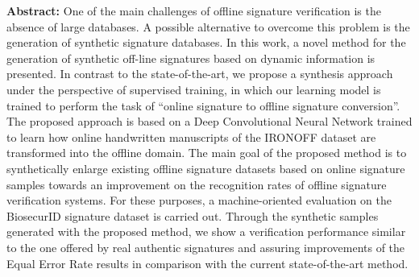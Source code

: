\begin{apendicesenv}
\textbf{Abstract:} One of the main challenges of offline signature verification is the absence of large databases. A possible alternative to overcome this problem is the generation of synthetic signature databases. In this work, a novel method for the generation of synthetic off-line signatures based on dynamic information is presented. In contrast to the state-of-the-art, we propose a synthesis approach under the perspective of supervised training, in which our learning model is trained to perform the task of “online signature to offline signature conversion”. The proposed approach is based on a Deep Convolutional Neural Network trained to learn how online handwritten manuscripts of the IRONOFF dataset are transformed into the offline domain. The main goal of the proposed method is to synthetically enlarge existing offline signature datasets based on online signature samples towards an improvement on the recognition rates of offline signature verification systems. For these purposes, a machine-oriented evaluation on the BiosecurID signature dataset is carried out. Through the synthetic samples generated with the proposed method, we show a verification performance similar to the one offered by real authentic signatures and assuring improvements of the Equal Error Rate results in comparison with the current state-of-the-art method.


\end{apendicesenv}
